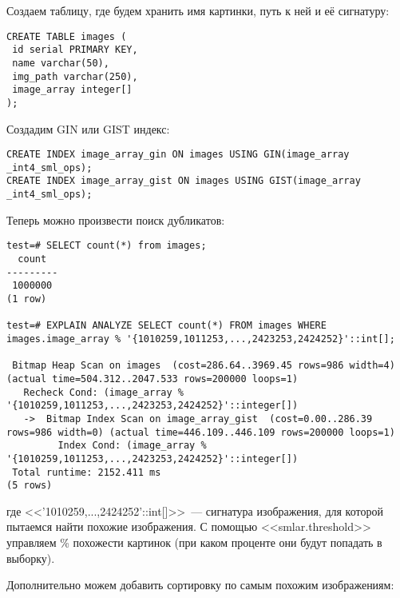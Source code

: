 Создаем таблицу, где будем хранить имя картинки, путь к ней и её сигнатуру:

\begin{lstlisting}[label=lst:smlar8,caption=Таблица для изображений]
CREATE TABLE images (
 id serial PRIMARY KEY,
 name varchar(50),
 img_path varchar(250),
 image_array integer[]
);
\end{lstlisting}

Создадим GIN или GIST индекс:

\begin{lstlisting}[label=lst:smlar9,caption=Создание GIN или GIST индекса]
CREATE INDEX image_array_gin ON images USING GIN(image_array _int4_sml_ops);
CREATE INDEX image_array_gist ON images USING GIST(image_array _int4_sml_ops);
\end{lstlisting}

Теперь можно произвести поиск дубликатов:

\begin{lstlisting}[label=lst:smlar10,caption=Поиск дубликатов]
test=# SELECT count(*) from images;
  count
---------
 1000000
(1 row)

test=# EXPLAIN ANALYZE SELECT count(*) FROM images WHERE images.image_array % '{1010259,1011253,...,2423253,2424252}'::int[];

 Bitmap Heap Scan on images  (cost=286.64..3969.45 rows=986 width=4) (actual time=504.312..2047.533 rows=200000 loops=1)
   Recheck Cond: (image_array % '{1010259,1011253,...,2423253,2424252}'::integer[])
   ->  Bitmap Index Scan on image_array_gist  (cost=0.00..286.39 rows=986 width=0) (actual time=446.109..446.109 rows=200000 loops=1)
         Index Cond: (image_array % '{1010259,1011253,...,2423253,2424252}'::integer[])
 Total runtime: 2152.411 ms
(5 rows)
\end{lstlisting}

где <<'{1010259,...,2424252}'::int[]>>~--- сигнатура изображения, для которой пытаемся найти похожие изображения. С помощью <<smlar.threshold>> управляем \% похожести картинок (при каком проценте они будут попадать в выборку).

Дополнительно можем добавить сортировку по самым похожим изображениям:

